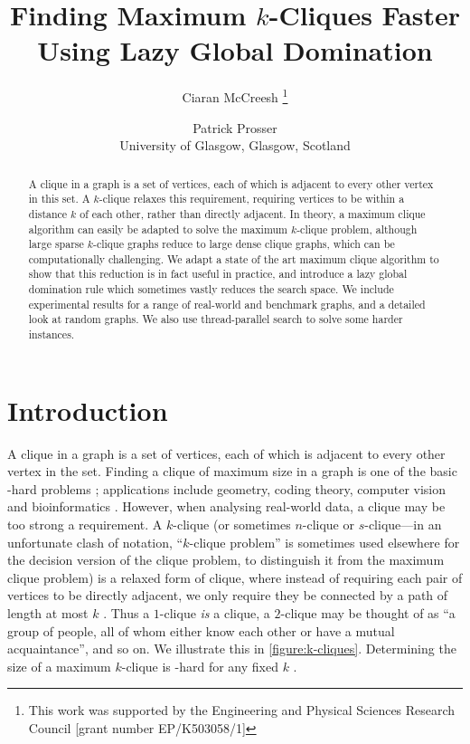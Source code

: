 \documentclass[letterpaper]{article}
\begin{document}
\title{Finding Maximum $k$-Cliques Faster Using Lazy Global Domination}
 \author{
    Ciaran McCreesh%
    \thanks{This work was supported by the Engineering and Physical Sciences Research Council [grant number EP/K503058/1]}
    \and
    Patrick Prosser
    \\ University of Glasgow, Glasgow, Scotland
}
\maketitle

\begin{abstract}
    A clique in a graph is a set of vertices, each of which is adjacent to every other vertex in
    this set. A $k$-clique relaxes this requirement, requiring vertices to be within a distance $k$
    of each other, rather than directly adjacent. In theory, a maximum clique algorithm can easily
    be adapted to solve the maximum $k$-clique problem, although large sparse $k$-clique graphs
    reduce to large dense clique graphs, which can be computationally challenging. We adapt a state of
    the art maximum clique algorithm to show that this reduction is in fact useful in practice, and
    introduce a lazy global domination rule which sometimes vastly reduces the search space. We
    include experimental results for a range of real-world and benchmark graphs, and a detailed look
    at random graphs. We also use thread-parallel search to solve some harder instances.
\end{abstract}

\section{Introduction}

A clique in a graph is a set of vertices, each of which is adjacent to every other vertex in the
set. Finding a clique of maximum size in a graph is one of the basic \NP-hard problems
\cite{Garey:1990}; applications include geometry, coding theory, computer vision and bioinformatics
\cite{Bomze:1999,Butenko:2006}. However, when analysing real-world data, a clique may be too strong
a requirement. A $k$-clique (or sometimes $n$-clique or $s$-clique---in an unfortunate clash of
notation, ``$k$-clique problem'' is sometimes used elsewhere for the decision version of the clique
problem, to distinguish it from the maximum clique problem) is a relaxed form of clique, where
instead of requiring each pair of vertices to be directly adjacent, we only require they be
connected by a path of length at most $k$ \cite{Luce:1950}.  Thus a $1$-clique \emph{is} a clique, a
$2$-clique may be thought of as ``a group of people, all of whom either know each other or have a
mutual acquaintance'', and so on. We illustrate this in \cref{figure:k-cliques}.  Determining the
size of a maximum $k$-clique is \NP-hard for any fixed $k$ \cite{Bourjolly:2002}.
\end{document}
